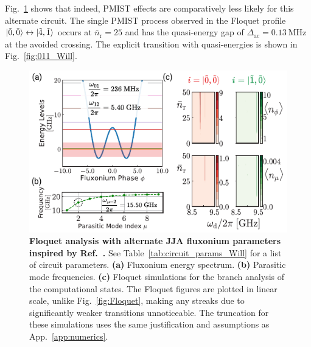 \documentclass[%
reprint,
superscriptaddress,
 amsmath,amssymb,
 aps,
 prx,
longbibliography,
floatfix,
]{revtex4-2}
\begin{document}
Fig.~\ref{fig:Floquet1} shows that indeed, PMIST effects are comparatively less likely for this alternate circuit. The single PMIST process observed in the Floquet profile $\ket{\tilde{0},\tilde{0}}\leftrightarrow\ket{\tilde{4},\tilde{1}}$ occurs at $\bar n_\textrm{r}=25$ and has the quasi-energy gap of $\Delta_\textrm{ac}=0.13 \ \mathrm{MHz}$ at the avoided crossing. The explicit transition with quasi-energies is shown in Fig.~\ref{fig:011_Will}. 
\begin{figure}[htb]
    \centering
    \includegraphics[width=\linewidth]{Figures/Floquet_Will.pdf}
    \caption{{\bf Floquet analysis with alternate JJA fluxonium parameters inspired by Ref.~\cite{ding_high-fidelity_2023}.} See Table~\ref{tab:circuit_params_Will} for a list of circuit parameters. \textbf{(a)} Fluxonium energy spectrum. \textbf{(b)} Parasitic mode frequencies. \textbf{(c)} Floquet simulations for the branch analysis of the computational states. The Floquet figures are plotted in linear scale, unlike Fig.~\ref{fig:Floquet}, making any streaks due to significantly weaker transitions unnoticeable. The truncation for these simulations uses the same justification and assumptions as App.~\ref{app:numerics}. }
    \label{fig:Floquet1}
\end{figure}
\end{document}
